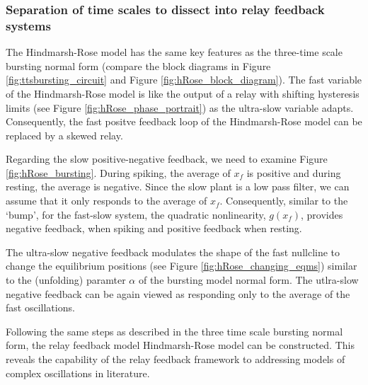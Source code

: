 \documentclass[a4paper, 12pt]{article}
\begin{document}
\subsubsection{Separation of time scales to dissect into relay feedback systems}
The Hindmarsh-Rose model has the same key features as the three-time scale bursting normal form (compare the block diagrams in Figure \ref{fig:ttsbursting_circuit} and Figure \ref{fig:hRose_block_diagram}). The fast variable of the Hindmarsh-Rose model is like the output of a relay with shifting hysteresis limits (see Figure \ref{fig:hRose_phase_portrait}) as the ultra-slow variable adapts. Consequently, the fast positve feedback loop of the Hindmarsh-Rose model can be replaced by a skewed relay. 

 Regarding the slow positive-negative feedback, we need to examine Figure \ref{fig:hRose_bursting}. During spiking, the average of $x_f$ is positive and during resting, the average is negative. Since the slow plant is a low pass filter, we can assume that it only responds to the average of $x_f$. Consequently, similar to the `bump', for the fast-slow system, the quadratic nonlinearity, $g(x_f)$, provides negative feedback, when spiking and positive feedback when resting.

The ultra-slow negative feedback modulates the shape of the fast nullcline to change the equilibrium positions (see Figure \ref{fig:hRose_changing_eqms}) similar to the (unfolding) paramter $\alpha$ of the bursting model normal form. The utlra-slow negative feedback can be again viewed as responding only to the average of the fast oscillations. 

Following the same steps as described in the three time scale bursting normal form, the relay feedback model Hindmarsh-Rose model can be constructed. This reveals the capability of the relay feedback framework to addressing models of complex oscillations in literature. 


\FloatBarrier
\end{document}
